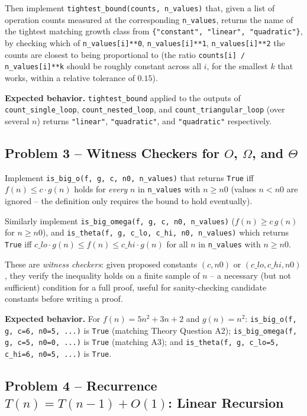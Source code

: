 \documentclass[11pt]{article}
\begin{document}
Then implement \texttt{tightest\_bound(counts, n\_values)} that, given a list of operation
counts measured at the corresponding \texttt{n\_values}, returns the name of the tightest
matching growth class from \texttt{\{"constant", "linear", "quadratic"\}}, by checking
which of \texttt{n\_values[i]**0}, \texttt{n\_values[i]**1}, \texttt{n\_values[i]**2} the
counts are closest to being proportional to (the ratio \texttt{counts[i] /
n\_values[i]**k} should be roughly constant across all $i$, for the smallest $k$ that
works, within a relative tolerance of $0.15$).

\textbf{Expected behavior.} \texttt{tightest\_bound} applied to the outputs of
\texttt{count\_single\_loop}, \texttt{count\_nested\_loop}, and
\texttt{count\_triangular\_loop} (over several $n$) returns \texttt{"linear"},
\texttt{"quadratic"}, and \texttt{"quadratic"} respectively.

\subsection*{Problem 3 -- Witness Checkers for $O$, $\Omega$, and $\Theta$}

Implement \texttt{is\_big\_o(f, g, c, n0, n\_values)} that returns \texttt{True} iff
$f(n) \le c \cdot g(n)$ holds for \emph{every} $n$ in \texttt{n\_values} with $n \ge n0$
(values $n < n0$ are ignored -- the definition only requires the bound to hold
eventually).

Similarly implement \texttt{is\_big\_omega(f, g, c, n0, n\_values)} ($f(n) \ge c\,g(n)$ for
$n \ge n0$), and \texttt{is\_theta(f, g, c\_lo, c\_hi, n0, n\_values)} which returns
\texttt{True} iff $c\_lo \cdot g(n) \le f(n) \le c\_hi \cdot g(n)$ for all $n$ in
\texttt{n\_values} with $n \ge n0$.

These are \emph{witness checkers}: given proposed constants $(c, n0)$ or $(c\_lo, c\_hi,
n0)$, they verify the inequality holds on a finite sample of $n$ -- a necessary (but not
sufficient) condition for a full proof, useful for sanity-checking candidate constants
before writing a proof.

\textbf{Expected behavior.} For $f(n) = 5n^2+3n+2$ and $g(n) = n^2$: \texttt{is\_big\_o(f,
g, c=6, n0=5, ...)} is \texttt{True} (matching Theory Question A2); \texttt{is\_big\_omega(f,
g, c=5, n0=0, ...)} is \texttt{True} (matching A3); and \texttt{is\_theta(f, g, c\_lo=5,
c\_hi=6, n0=5, ...)} is \texttt{True}.

\subsection*{Problem 4 -- Recurrence $T(n) = T(n-1) + O(1)$: Linear Recursion}
\end{document}
